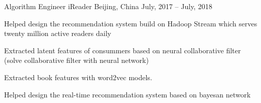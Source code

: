 
\begin{cventries}
  \cventry
    {Algorithm Engineer} %
    {iReader} %
    {Beijing, China} %
    {July, 2017 -- July, 2018} %
    {
      \begin{cvitems} %
        \item {Helped design the recommendation system build on Hadoop Stream which serves twenty million active readers daily}
        \item {Extracted latent features of consummers based on neural collaborative filter (solve collaborative filter with neural network)}
        \item {Extracted book features with word2vec models. }
        \item {Helped design the real-time recommendation system based on bayesan network}
      \end{cvitems}
    }
\end{cventries}

